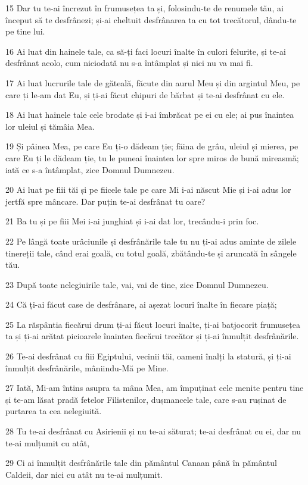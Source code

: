 \par 15 Dar tu te-ai încrezut în frumusețea ta și, folosindu-te de renumele tău, ai început să te desfrânezi; și-ai cheltuit desfrânarea ta cu tot trecătorul, dându-te pe tine lui.
\par 16 Ai luat din hainele tale, ca să-ți faci locuri înalte în culori felurite, și te-ai desfrânat acolo, cum niciodată nu s-a întâmplat și nici nu va mai fi.
\par 17 Ai luat lucrurile tale de găteală, făcute din aurul Meu și din argintul Meu, pe care ți le-am dat Eu, și ți-ai făcut chipuri de bărbat și te-ai desfrânat cu ele.
\par 18 Ai luat hainele tale cele brodate și i-ai îmbrăcat pe ei cu ele; ai pus înaintea lor uleiul și tămâia Mea.
\par 19 Și pâinea Mea, pe care Eu ți-o dădeam ție; făina de grâu, uleiul și mierea, pe care Eu ți le dădeam ție, tu le puneai înaintea lor spre miros de bună mireasmă; iată ce s-a întâmplat, zice Domnul Dumnezeu.
\par 20 Ai luat pe fiii tăi și pe fiicele tale pe care Mi i-ai născut Mie și i-ai adus lor jertfă spre mâncare. Dar puțin te-ai desfrânat tu oare?
\par 21 Ba tu și pe fiii Mei i-ai junghiat și i-ai dat lor, trecându-i prin foc.
\par 22 Pe lângă toate urâciunile și desfrânările tale tu nu ți-ai adus aminte de zilele tinereții tale, când erai goală, cu totul goală, zbătându-te și aruncată în sângele tău.
\par 23 După toate nelegiuirile tale, vai, vai de tine, zice Domnul Dumnezeu.
\par 24 Că ți-ai făcut case de desfrânare, ai așezat locuri înalte în fiecare piață;
\par 25 La răspântia fiecărui drum ți-ai făcut locuri înalte, ți-ai batjocorit frumusețea ta și ți-ai arătat picioarele înaintea fiecărui trecător și ți-ai înmulțit desfrânările.
\par 26 Te-ai desfrânat cu fiii Egiptului, vecinii tăi, oameni înalți la statură, și ți-ai înmulțit desfrânările, mâniindu-Mă pe Mine.
\par 27 Iată, Mi-am întins asupra ta mâna Mea, am împuținat cele menite pentru tine și te-am lăsat pradă fetelor Filistenilor, dușmancele tale, care s-au rușinat de purtarea ta cea nelegiuită.
\par 28 Tu te-ai desfrânat cu Asirienii și nu te-ai săturat; te-ai desfrânat cu ei, dar nu te-ai mulțumit cu atât,
\par 29 Ci ai înmulțit desfrânările tale din pământul Canaan până în pământul Caldeii, dar nici cu atât nu te-ai mulțumit.
